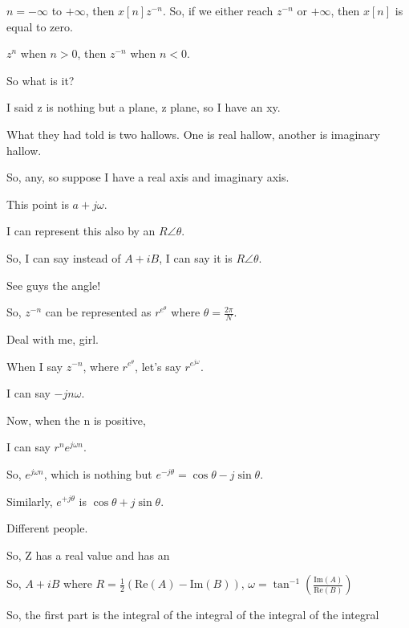 \documentclass{article}
\begin{document}
$n = -\infty$ to $+\infty$, then $x[n]z^{-n}$. So, if we either reach $z^{-n}$ or $+ \infty$, then $x[n]$ is equal to zero.

$z^n$ when $n > 0$, then $z^{-n}$ when $n < 0$.

So what is it?

I said z is nothing but a plane, z plane, so I have an xy.

What they had told is two hallows. One is real hallow, another is imaginary hallow.

So, any, so suppose I have a real axis and imaginary axis.

This point is $a + j\omega$.

I can represent this also by an $R \angle \theta$.



So, I can say instead of $A + iB$, I can say it is $R \angle \theta$.

See guys the angle!



So, $z^{-n}$ can be represented as $r^{e^{\theta}}$ where $\theta = \frac{2\pi}{N}$.

Deal with me, girl.

When I say $z^{-n}$, where $r^{e^{\theta}}$, let's say $r^{e^{j\omega}}$.

I can say $-jn\omega$.

Now, when the n is positive,

I can say $r^n e^{j\omega n}$.

So, $e^{j\omega n}$, which is nothing but $e^{-j\theta} = \cos{\theta} - j\sin{\theta}$.

Similarly, $e^{+j\theta}$ is $\cos{\theta} + j\sin{\theta}$.

Different people.



So, Z has a real value and has an

So, $A + iB$ where $R = \frac{1}{2}(\text{Re}(A) - \text{Im}(B))$, $\omega = \tan^{-1}\left(\frac{\text{Im}(A)}{\text{Re}(B)}\right)$

So, the first part is the integral of the integral of the integral of the integral
\end{document}
